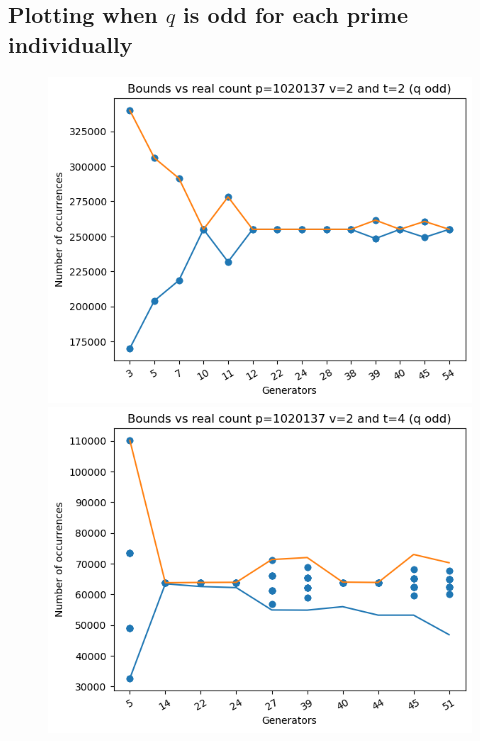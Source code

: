 \documentclass{article}
\begin{document}
\subsection{Plotting when $q$ is odd for each prime individually}
\begin{figure}[H]
    \begin{minipage}{.49\textwidth}
            \centering
            \includegraphics[width=\textwidth]{../plots/tuples_figures/1020137v2qodd/test_p1020137_v2_t2_q_odd.png}
            \includegraphics[width=\textwidth]{../plots/tuples_figures/1020137v2qodd/test_p1020137_v2_t4_q_odd.png}

\end{minipage}
\end{figure}
\end{document}
